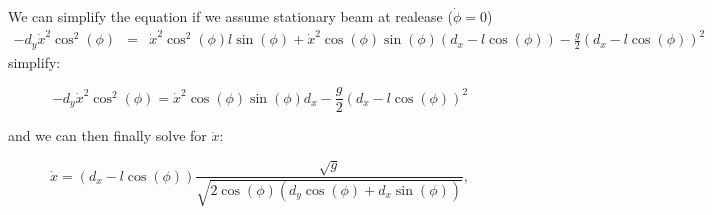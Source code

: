 We can simplify the equation if we assume stationary beam at realease
($\dot{\phi}=0$) 
\begin{eqnarray*}
-d_{y}\dot{x}^{2}\cos^{2}(\phi) & = & \dot{x}^{2}\cos^{2}(\phi)l\sin(\phi)+\dot{x}^{2}\cos(\phi)\sin(\phi)\left(d_{x}-l\cos(\phi)\right)-\frac{g}{2}\left(d_{x}-l\cos(\phi)\right)^{2}
\end{eqnarray*}
simplify:

\[
-d_{y}\dot{x}^{2}\cos^{2}(\phi)=\dot{x}^{2}\cos(\phi)\sin(\phi)d_{x}-\frac{g}{2}\left(d_{x}-l\cos(\phi)\right)^{2}
\]


and we can then finally solve for $\dot{x}$:

\[
\dot{x}=\left(d_{x}-l\cos(\phi)\right)\frac{\sqrt{g}}{\sqrt{2\cos(\phi)\left(d_{y}\cos(\phi)+d_{x}\sin(\phi)\right)}},
\]